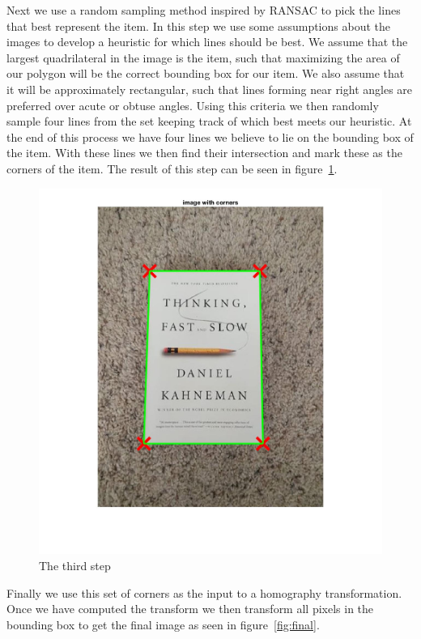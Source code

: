 Next we use a random sampling method inspired by RANSAC to pick the lines that best represent the item.
In this step we use some assumptions about the images to develop a heuristic for which lines should be best.
We assume that the largest quadrilateral in the image is the item, such that maximizing the area of our polygon will be the correct bounding box for our item.
We also assume that it will be approximately rectangular, such that lines forming near right angles are preferred over acute or obtuse angles.
Using this criteria we then randomly sample four lines from the set keeping track of which best meets our heuristic.
At the end of this process we have four lines we believe to lie on the bounding box of the item.
With these lines we then find their intersection and mark these as the corners of the item.
The result of this step can be seen in figure~\ref{fig:box}.


\begin{figure}[t]
\begin{center}
   \includegraphics[width=0.8\linewidth]{figures/step3.jpg}
\end{center}
\caption{The third step}
\label{fig:box}
\end{figure}

Finally we use this set of corners as the input to a homography transformation.
Once we have computed the transform we then transform all pixels in the bounding box to get the final image as seen in figure~\ref{fig:final}.



